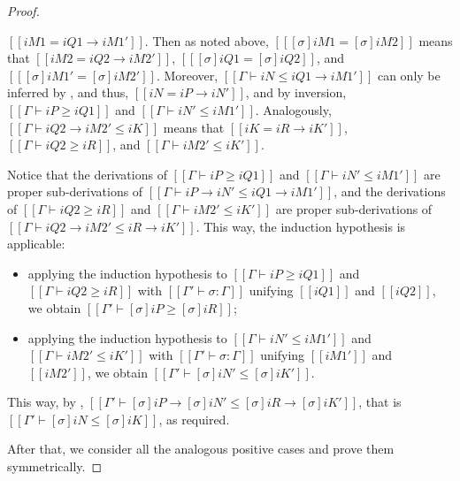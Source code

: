\begin{proof}
\begin{caseof}
    \item $[[iM1 = iQ1 → iM1']]$. Then as noted above, 
      $[[ [σ]iM1 = [σ]iM2 ]]$ means that $[[iM2 = iQ2 → iM2']]$, $[[ [σ]iQ1 = [σ]iQ2 ]]$, and $[[ [σ]iM1' = [σ]iM2' ]]$.
      Moreover, $[[Γ ⊢ iN ≤ iQ1 → iM1']]$ can only be inferred by ,
      and thus, $[[iN = iP → iN']]$, and by inversion, $[[Γ ⊢ iP ≥ iQ1]]$ and $[[Γ ⊢ iN' ≤ iM1']]$.
      Analogously, $[[Γ ⊢ iQ2 → iM2' ≤ iK]]$ means that $[[iK = iR → iK']]$, $[[Γ ⊢ iQ2 ≥ iR]]$, and $[[Γ ⊢ iM2' ≤ iK']]$.

      Notice that the derivations of $[[Γ ⊢ iP ≥ iQ1]]$ and $[[Γ ⊢ iN' ≤ iM1']]$ are proper sub-derivations of
      $[[Γ ⊢ iP → iN' ≤ iQ1 → iM1']]$, and the derivations of $[[Γ ⊢ iQ2 ≥ iR]]$ and $[[Γ ⊢ iM2' ≤ iK']]$ are proper sub-derivations of
      $[[Γ ⊢ iQ2 → iM2' ≤ iR → iK']]$. This way, the induction hypothesis is applicable:
      \begin{itemize}
        \item applying the induction hypothesis to $[[Γ ⊢ iP ≥ iQ1]]$ and $[[Γ ⊢ iQ2 ≥ iR]]$ 
          with $[[Γ' ⊢ σ : Γ]]$ unifying $[[iQ1]]$ and $[[iQ2]]$, we obtain $[[Γ' ⊢ [σ]iP ≥ [σ]iR]]$;
        \item applying the induction hypothesis to $[[Γ ⊢ iN' ≤ iM1']]$ and $[[Γ ⊢ iM2' ≤ iK']]$ 
          with $[[Γ' ⊢ σ : Γ]]$ unifying $[[iM1']]$ and $[[iM2']]$, we obtain $[[Γ' ⊢ [σ]iN' ≤ [σ]iK']]$.
      \end{itemize}
      This way, by , $[[Γ' ⊢ [σ]iP → [σ]iN' ≤ [σ]iR → [σ]iK']]$,
      that is $[[Γ' ⊢ [σ]iN ≤ [σ]iK]]$, as required.
  \end{caseof}
  After that, we consider all the 
  analogous positive cases and prove them symmetrically.
\end{proof}

\corollaryEquivalenceTransitivity*
